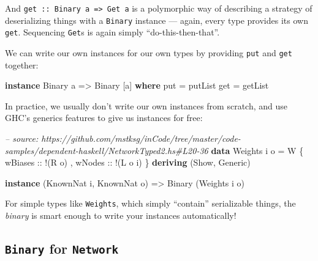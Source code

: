 \documentclass[]{article}
\newenvironment{Shaded}{}{}
\newcommand{\KeywordTok}[1]{\textcolor[rgb]{0.00,0.44,0.13}{\textbf{{#1}}}}
\newcommand{\DataTypeTok}[1]{\textcolor[rgb]{0.56,0.13,0.00}{{#1}}}
\newcommand{\CommentTok}[1]{\textcolor[rgb]{0.38,0.63,0.69}{\textit{{#1}}}}
\newcommand{\OtherTok}[1]{\textcolor[rgb]{0.00,0.44,0.13}{{#1}}}
\newcommand{\FunctionTok}[1]{\textcolor[rgb]{0.02,0.16,0.49}{{#1}}}
\newcommand{\NormalTok}[1]{{#1}}
\begin{document}
And \texttt{get\ ::\ Binary\ a\ =\textgreater{}\ Get\ a} is a polymorphic way of
describing a strategy of deserializing things with a \texttt{Binary} instance
--- again, every type provides its own \texttt{get}. Sequencing \texttt{Get}s is
again simply ``do-this-then-that''.

We can write our own instances for our own types by providing \texttt{put} and
\texttt{get} together:

\begin{Shaded}
\begin{Highlighting}[]
\KeywordTok{instance} \DataTypeTok{Binary} \NormalTok{a }\OtherTok{=>} \DataTypeTok{Binary} \NormalTok{[a] }\KeywordTok{where}
    \NormalTok{put }\FunctionTok{=} \NormalTok{putList}
    \NormalTok{get }\FunctionTok{=} \NormalTok{getList}
\end{Highlighting}
\end{Shaded}

In practice, we usually don't write our own instances from scratch, and use
GHC's generics features to give us instances for free:

\begin{Shaded}
\begin{Highlighting}[]
\CommentTok{-- source: https://github.com/mstksg/inCode/tree/master/code-samples/dependent-haskell/NetworkTyped2.hs#L20-36}
\KeywordTok{data} \DataTypeTok{Weights} \NormalTok{i o }\FunctionTok{=} \DataTypeTok{W} \NormalTok{\{}\OtherTok{ wBiases ::} \FunctionTok{!}\NormalTok{(}\DataTypeTok{R} \NormalTok{o)}
                     \NormalTok{,}\OtherTok{ wNodes  ::} \FunctionTok{!}\NormalTok{(}\DataTypeTok{L} \NormalTok{o i)}
                     \NormalTok{\}}
  \KeywordTok{deriving} \NormalTok{(}\DataTypeTok{Show}\NormalTok{, }\DataTypeTok{Generic}\NormalTok{)}

\KeywordTok{instance} \NormalTok{(}\DataTypeTok{KnownNat} \NormalTok{i, }\DataTypeTok{KnownNat} \NormalTok{o) }\OtherTok{=>} \DataTypeTok{Binary} \NormalTok{(}\DataTypeTok{Weights} \NormalTok{i o)}
\end{Highlighting}
\end{Shaded}

For simple types like \texttt{Weights}, which simply ``contain'' serializable
things, the \emph{binary} is smart enough to write your instances automatically!

\subsection{\texorpdfstring{\texttt{Binary} for
\texttt{Network}}{Binary for Network}}\label{binary-for-network}
\end{document}
